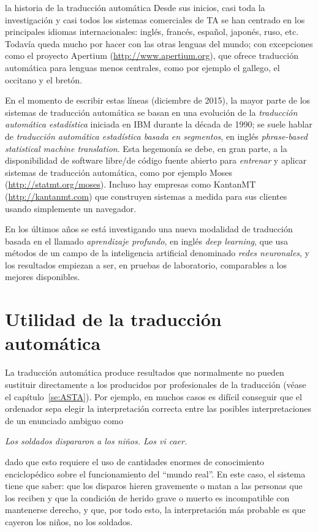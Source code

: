 \begin{persabermes}{la historia de la traducción automática}
Desde sus inicios, casi toda la investigación y casi todos los sistemas comerciales de TA se han centrado en los principales idiomas internacionales: inglés, francés, español, japonés, ruso, etc. Todavía queda mucho por hacer con las otras lenguas del mundo; con excepciones como el proyecto Apertium (\url{http://www.apertium.org}), que ofrece traducción automática para lenguas menos centrales, como por ejemplo el gallego, el occitano y el bretón. 

En el momento de escribir estas líneas (diciembre de 2015), la mayor parte de los sistemas de traducción automática se basan en una evolución de la \emph{traducción automática estadística} iniciada en IBM durante la década de 1990; se suele hablar de \emph{traducción automática estadística basada en segmentos}, en inglés \emph{phrase-based statistical machine translation}. Esta hegemonía se debe, en gran parte, a la disponibilidad de software libre/de código fuente abierto para \emph{entrenar} y aplicar sistemas de traducción automática, como por ejemplo Moses (\url{http://statmt.org/moses}). Incluso hay empresas como KantanMT (\url{http://kantanmt.com}) que construyen sistemas a medida para sus clientes usando simplemente un navegador. 

En los últimos años se está investigando una nueva modalidad de traducción basada en el llamado \emph{aprendizaje profundo}, en inglés \emph{deep learning}, que usa métodos de un campo de la inteligencia artificial denominado \emph{redes neuronales}, y los resultados empiezan a ser, en pruebas de laboratorio, comparables a los mejores disponibles. 

\end{persabermes} 

\section{Utilidad de la traducción automática} \label{ss:UTA} La traducción automática produce resultados que normalmente no pueden sustituir directamente a los producidos por profesionales de la traducción (véase el capítulo~\ref{se:ASTA}). Por ejemplo, en muchos casos es difícil conseguir que el ordenador sepa elegir la interpretación correcta entre las posibles interpretaciones de un enunciado ambiguo como \begin{center} \emph{Los soldados dispararon a los niños. Los vi caer.} \end{center} dado que esto requiere el uso de cantidades enormes de conocimiento enciclopédico sobre el funcionamiento del ``mundo real''. En este caso, el sistema tiene que saber: que los disparos hieren gravemente o matan a las personas que los reciben y que la condición de herido grave o muerto es incompatible con mantenerse derecho, y que, por todo esto, la interpretación más probable es que cayeron los niños, no los soldados. 

